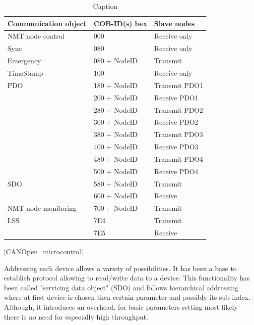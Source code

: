 \begin{table}[]
    \centering
    \begin{tabular}{|p{}|p{}|p{}|}
        \hline
        \textbf{Communication object} & \textbf{COB-ID(s) hex} & \textbf{Slave nodes} \\
        \hline
        NMT node control & 000 & Receive only \\
        \hline
        Sync & 080 & Receive only \\
        \hline
        Emergency & 080 + NodeID & Transmit \\
        \hline
        TimeStamp & 100 & Receive only \\
        \hline
        PDO & 180 + NodeID & Transmit PDO1 \\
            & 200 + NodeID & Receive PDO1 \\
            & 280 + NodeID & Transmit PDO2 \\
            & 300 + NodeID & Receive PDO2 \\
            & 380 + NodeID & Transmit PDO3 \\
            & 400 + NodeID & Receive PDO3 \\
            & 480 + NodeID & Transmit PDO4 \\
            & 500 + NodeID & Receive PDO4 \\
        \hline
        SDO & 580 + NodeID & Transmit \\
            & 600 + NodeID & Receive \\
        \hline
        NMT node monitoring & 700 + NodeID & Transmit \\
        \hline
        LSS & 7E4 & Transmit \\
            & 7E5 & Receive \\
        \hline
    \end{tabular}
    \caption{Caption}
    \label{tab:my_label}
\end{table}\ref{CANOpen_microcontrol}

Addressing each device allows a variety of possibilities. It has been a base to establish protocol allowing to read/write data to a device.
This functionality has been called "servicing data object" (SDO) and follows hierarchical addressing where at first device is chosen then certain parameter and possibly its sub-index. Although, it introduces an overhead, for basic parameters setting most likely there is no need for especially high throughput. 

